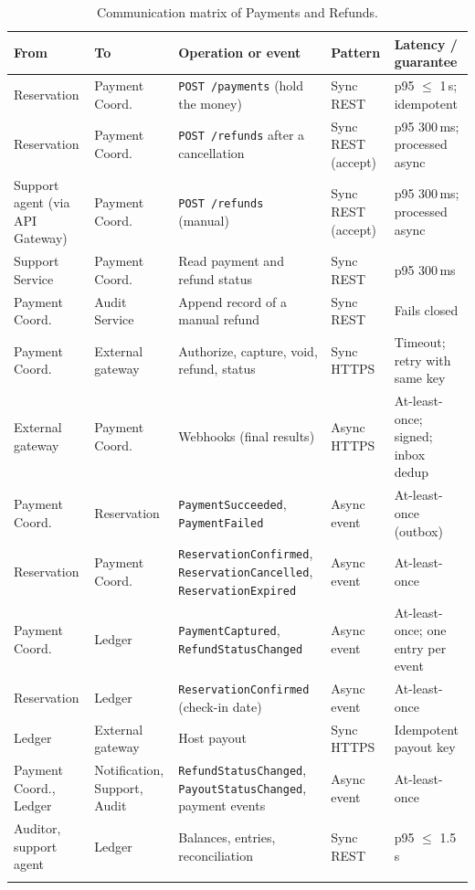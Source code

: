 \begin{longtable}{@{}L{2.3cm}L{2.3cm}L{4.0cm}L{1.6cm}L{2.5cm}@{}}
\toprule
\textbf{From} & \textbf{To} & \textbf{Operation or event} & \textbf{Pattern} & \textbf{Latency / guarantee} \\
\midrule
\endhead
Reservation & Payment Coord. & \texttt{POST /payments} (hold the money) & Sync REST & p95 $\leq$ 1\,s; idempotent \\
Reservation & Payment Coord. & \texttt{POST /refunds} after a cancellation & Sync REST (accept) & p95 300\,ms; processed async \\
Support agent (via API Gateway) & Payment Coord. & \texttt{POST /refunds} (manual) & Sync REST (accept) & p95 300\,ms; processed async \\
Support Service & Payment Coord. & Read payment and refund status & Sync REST & p95 300\,ms \\
Payment Coord. & Audit Service & Append record of a manual refund & Sync REST & Fails closed \\
Payment Coord. & External gateway & Authorize, capture, void, refund, status & Sync HTTPS & Timeout; retry with same key \\
External gateway & Payment Coord. & Webhooks (final results) & Async HTTPS & At-least-once; signed; inbox dedup \\
Payment Coord. & Reservation & \texttt{Payment\allowbreak Succeeded}, \texttt{Payment\allowbreak Failed} & Async event & At-least-once (outbox) \\
Reservation & Payment Coord. & \texttt{Reservation\allowbreak Confirmed}, \texttt{Reservation\allowbreak Cancelled}, \texttt{Reservation\allowbreak Expired} & Async event & At-least-once \\
Payment Coord. & Ledger & \texttt{Payment\allowbreak Captured}, \texttt{Refund\allowbreak Status\allowbreak Changed} & Async event & At-least-once; one entry per event \\
Reservation & Ledger & \texttt{Reservation\allowbreak Confirmed} (check-in date) & Async event & At-least-once \\
Ledger & External gateway & Host payout & Sync HTTPS & Idempotent payout key \\
Payment Coord., Ledger & Notification, Support, Audit & \texttt{Refund\allowbreak Status\allowbreak Changed}, \texttt{Payout\allowbreak Status\allowbreak Changed}, payment events & Async event & At-least-once \\
Auditor, support agent & Ledger & Balances, entries, reconciliation & Sync REST & p95 $\leq$ 1.5\,s \\
\bottomrule
\caption{Communication matrix of Payments and Refunds.}
\label{tab:pay-matrix}
\end{longtable}
\endgroup

